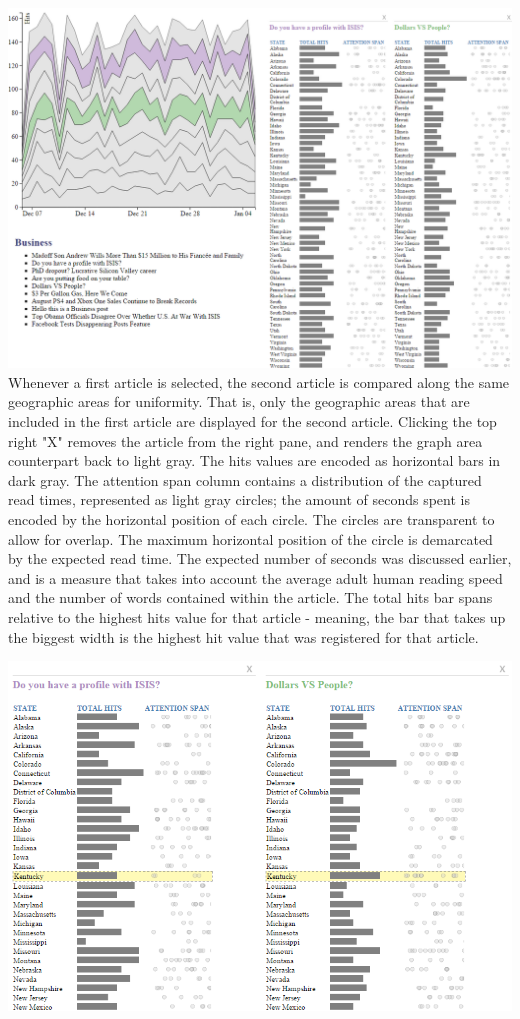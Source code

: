 \documentclass[12pt]{article}
\begin{document}
{\noindent\includegraphics[scale=0.5]{img/viz_8} \\

Whenever a first article is selected, the second article is compared along the same geographic areas for uniformity. That is, only the geographic areas that are included in the first article are displayed for the second article. Clicking the top right "X" removes the article from the right pane, and renders the graph area counterpart back to light gray. 
The hits values are encoded as horizontal bars in dark gray. The attention span column contains a distribution of the captured read times, represented as light gray circles; the amount of seconds spent is encoded by the horizontal position of each circle. The circles are transparent to allow for overlap. The maximum horizontal position of the circle is demarcated by the expected read time. The expected number of seconds was discussed earlier, and is a measure that takes into account the average adult human reading speed and the number of words contained within the article. The total hits bar spans relative to the highest hits value for that article - meaning, the bar that takes up the biggest width is the highest hit value that was registered for that article. 

\vfill

\noindent\includegraphics[scale=0.8]{img/viz_9} \\

}
\end{document}
